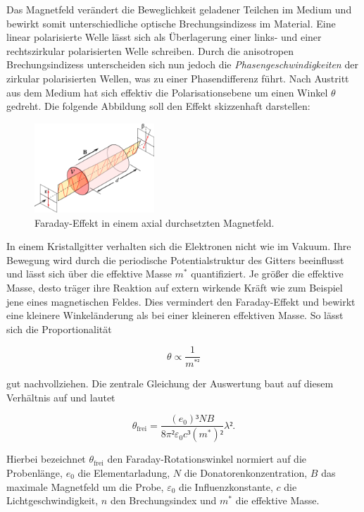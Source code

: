 \noindent Das Magnetfeld verändert die Beweglichkeit geladener Teilchen im Medium und bewirkt somit unterschiedliche optische Brechungsindizess
im Material. Eine linear polarisierte Welle lässt sich als Überlagerung einer links- und einer rechtszirkular polarisierten Welle schreiben. 
Durch die anisotropen Brechungsindizess unterscheiden sich nun jedoch die \textit{Phasengeschwindigkeiten} der zirkular polarisierten Wellen, 
was zu einer Phasendifferenz führt. Nach Austritt aus dem Medium hat sich effektiv die Polarisationsebene um einen Winkel $\theta$ gedreht. 
Die folgende Abbildung soll den Effekt skizzenhaft darstellen:

\begin{figure}[H]
    \centering
    \includegraphics[width=0.4\textwidth]{Faraday.png}
    \caption{Faraday-Effekt in einem axial durchsetzten Magnetfeld.}
    \label{fig:Faraday}
\end{figure}

\noindent In einem Kristallgitter verhalten sich die Elektronen nicht wie im Vakuum. Ihre Bewegung wird durch die periodische Potentialstruktur
des Gitters beeinflusst und lässt sich über die effektive Masse $m^{\ast}$ quantifiziert. Je größer die effektive Masse, desto träger 
ihre Reaktion auf extern wirkende Kräft wie zum Beispiel jene eines magnetischen Feldes. Dies vermindert den Faraday-Effekt und bewirkt 
eine kleinere Winkeländerung als bei einer kleineren effektiven Masse. So lässt sich die Proportionalität

\begin{equation}
    \theta \propto \frac{1}{m^{\ast²}}
\end{equation}

\noindent gut nachvollziehen. Die zentrale Gleichung der Auswertung baut auf diesem Verhältnis auf und lautet

\begin{equation}
    \theta_\text{frei} = \frac{(e_0)³NB}{8\pi{}²\varepsilon_{0}c³(m^{\ast})²}\lambda².
\end{equation}

\noindent Hierbei bezeichnet $\theta_\text{frei}$ den Faraday-Rotationswinkel normiert auf die Probenlänge, $e_0$ die Elementarladung, $N$ die Donatorenkonzentration,
$B$ das maximale Magnetfeld um die Probe, $\varepsilon_0$ die Influenzkonstante, $c$ die Lichtgeschwindigkeit, $n$ den 
Brechungsindex und $m^{\ast}$ die effektive Masse.

